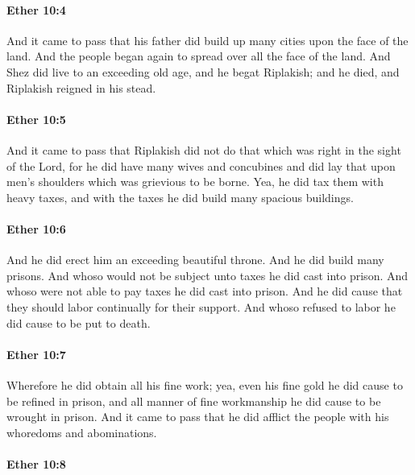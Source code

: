 		\paragraph{Ether 10:4} %
			\label{ETHER-10-4}

			And it came to pass that
			his father did build up many cities upon the face of the land.
			And the people began again to spread over all the face of the land.
			And Shez did live to an exceeding old age,
			and he begat Riplakish;
			and he died,
			and Riplakish reigned in his stead.

		\paragraph{Ether 10:5} %
			\label{ETHER-10-5}

			And it came to pass that Riplakish did not do that
			which was right in the sight of the Lord,
			for he did have many wives and concubines
			and did lay that upon men's shoulders which was grievious to be borne.
			Yea, he did tax them with heavy taxes,
			and with the taxes he did build many spacious buildings.

		\paragraph{Ether 10:6} %
			\label{ETHER-10-6}

			And he did erect him an exceeding beautiful throne.
			And he did build many prisons.
			And whoso would not be subject unto taxes he did cast into prison.
			And whoso were not able to pay taxes he did cast into prison.
			And he did cause that they should labor continually for their support.
			And whoso refused to labor he did cause to be put to death.

		\paragraph{Ether 10:7} %
			\label{ETHER-10-7}

			Wherefore he did obtain all his fine work;
			yea, even his fine gold he did cause to be refined in prison,
			and all manner of fine workmanship he did cause to be wrought in prison.
			And it came to pass that
			he did afflict the people with his whoredoms and abominations.

		\paragraph{Ether 10:8} %
			\label{ETHER-10-8}

